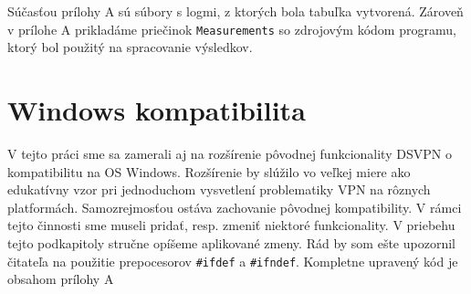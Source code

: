 \begin{table}[h!]
	\centering
	\caption{Výsledky z experimentálnych meraní funkcií na šifrovanie a dešifrovanie v prostredí virtuálnych strojov}
	\label{tabmer}
\end{table}

Súčasťou prílohy A sú súbory s logmi, z ktorých bola tabuľka vytvorená. Zároveň v prílohe A prikladáme priečinok \lstinline|Measurements| so zdrojovým kódom programu, ktorý bol použitý na spracovanie výsledkov.  
\section{Windows kompatibilita}
V tejto práci sme sa zamerali aj na rozšírenie pôvodnej funkcionality DSVPN o kompatibilitu na OS Windows. Rozšírenie by slúžilo vo veľkej miere ako edukatívny vzor pri jednoduchom vysvetlení problematiky VPN na rôznych platformách. Samozrejmosťou ostáva zachovanie pôvodnej kompatibility. V rámci tejto činnosti sme museli pridať, resp. zmeniť niektoré funkcionality. V priebehu tejto podkapitoly stručne opíšeme aplikované zmeny. Rád by som ešte upozornil čitateľa na použitie prepocesorov \lstinline|#ifdef| a \lstinline|#ifndef|. Kompletne upravený kód je obsahom prílohy A

